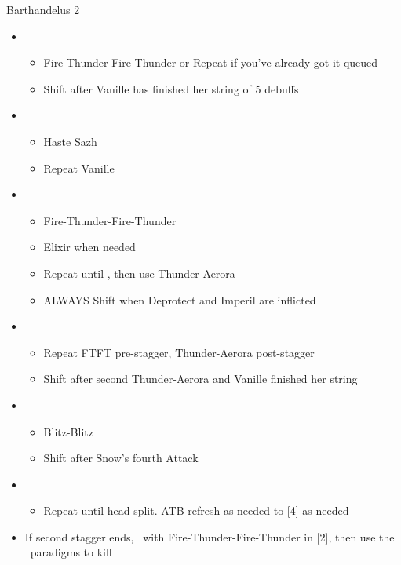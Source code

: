 \begin{battle}{Barthandelus 2}
\begin{multicols}{2}
\begin{itemize}
      \item \fifth
            \begin{itemize}
              \item Fire-Thunder-Fire-Thunder or Repeat if you've already got it queued
              \item Shift after Vanille has finished her string of 5 debuffs
            \end{itemize}
      \item \first
            \begin{itemize}
              \item Haste Sazh
              \item Repeat Vanille
            \end{itemize}
      \item \fifth
            \begin{itemize}
              \item Fire-Thunder-Fire-Thunder
              \item Elixir when needed
              \item Repeat until \stagger, then use Thunder-Aerora
              \item ALWAYS Shift when Deprotect and Imperil are inflicted
            \end{itemize}
      \item \second
            \begin{itemize}
              \item Repeat FTFT pre-stagger, Thunder-Aerora post-stagger
              \item Shift after second Thunder-Aerora and Vanille finished her string
            \end{itemize}
      \item \fourth
            \begin{itemize}
              \item Blitz-Blitz
              \item Shift after Snow's fourth Attack
            \end{itemize}
      \item \sixth
            \begin{itemize}
              \item Repeat until head-split. ATB refresh as needed to [4] as needed
            \end{itemize}
      \item If second stagger ends, \stagger\ with \linebreak Fire-Thunder-Fire-Thunder in [2], then use the \com\ paradigms to kill
    \end{itemize}
    \null
  \end{multicols}
\end{battle}

